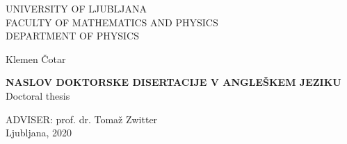 \setcounter{topnumber}{4}
\setcounter{bottomnumber}{4}
\setcounter{totalnumber}{5}
\renewcommand{\topfraction}{0.99}
\renewcommand{\bottomfraction}{0.99}
\renewcommand{\textfraction}{0.0}
\setlength{\tabcolsep}{10pt}
\renewcommand{\arraystretch}{1.5}

\def\bi#1{\hbox{\boldmath{$#1$}}}
\let\oldvec\vec
\def\vec#1{\mbox{\boldmath$#1$}}
\def\pol{{\textstyle{1\over2}}}
\def\svec#1{\mbox{{\scriptsize \boldmath$#1$}}}

\newcommand{\G}{{\it Gaia}}
\newcommand{\Teffn}[1]{$T_\mathrm{eff#1}$}
\newcommand{\Feh}{$\mathrm{[Fe/H]}$}
\newcommand{\Mh}{$\mathrm{[M/H]}$}
\newcommand{\rb}[1]{\textcolor{red}{\textbf{#1}}}
\newcommand{\bb}[1]{\textcolor{black}{\textbf{#1}}}
\newcommand{\TC}{\textit{The Cannon}}
\newcommand{\kms}{\,km\,s$^{-1}$}
\newcommand{\cms}{\,cm\,s$^{-2}$}
\newcommand{\vsin}{$v \sin i$}
\newcommand\arcmin{\hbox{$^\prime$}}
\newcommand\arcsec{\hbox{$^{\prime\prime}$}}
\newcommand{\Teff}{$T_\mathrm{eff}$}
\newcommand{\Logg}{$\log g$}
\newcommand{\Meh}{$\mathrm{[M/H]}$}
\newcommand{\Cfe}{$\mathrm{[C/Fe]}$}
\newcommand{\CO}{$\mathrm{[C/O]}$}
\newcommand{\e}[1]{\textbf{#1}}




\pagestyle{empty}
\begin{center}

{\large UNIVERSITY OF LJUBLJANA\\
FACULTY OF MATHEMATICS AND PHYSICS\\
DEPARTMENT OF PHYSICS\\}

\vspace{4cm}

{\Large Klemen Čotar\\}

\vspace{10mm}

{\bf \Large NASLOV DOKTORSKE DISERTACIJE V ANGLEŠKEM JEZIKU}\\
\vspace{5mm}
{\sc Doctoral thesis}\\

\vfill

{\large ADVISER: prof. dr. Tomaž Zwitter\\

\vspace{2cm}
Ljubljana, 2020}

\end{center}

